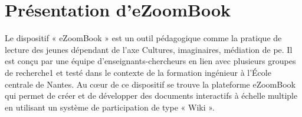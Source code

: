 \section{Présentation d'eZoomBook}
Le dispositif « eZoomBook » est un outil pédagogique comme la pratique de lecture des jeunes dépendant de l'axe Cultures, imaginaires, médiation de pe. Il est conçu par une équipe d’enseignants-chercheurs en lien avec plusieurs groupes de recherche1 et testé dans le contexte de la formation ingénieur à l’École centrale de Nantes. Au cœur de ce dispositif se trouve la plateforme eZoomBook qui permet de créer et de développer des documents interactifs à échelle multiple en utilisant un système de participation de type « Wiki ». 
